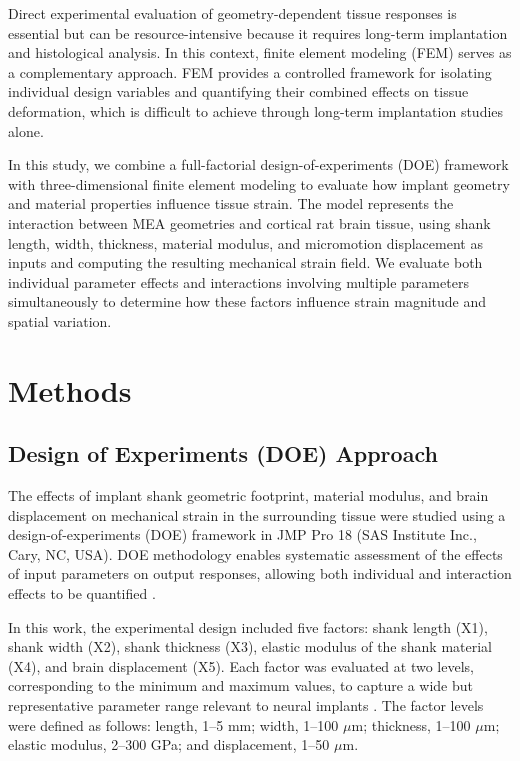 \documentclass[fleqn,10pt]{wlscirep}
\begin{document}
Direct experimental evaluation of geometry-dependent tissue responses is essential but can be resource-intensive because it requires long-term implantation and histological analysis. In this context, finite element modeling (FEM) serves as a complementary approach. FEM provides a controlled framework for isolating individual design variables and quantifying their combined effects on tissue deformation, which is difficult to achieve through long-term implantation studies alone.

In this study, we combine a full-factorial design-of-experiments (DOE) framework with three-dimensional finite element modeling to evaluate how implant geometry and material properties influence tissue strain. The model represents the interaction between MEA geometries and cortical rat brain tissue, using shank length, width, thickness, material modulus, and micromotion displacement as inputs and computing the resulting mechanical strain field. We evaluate both individual parameter effects and interactions involving multiple parameters simultaneously to determine how these factors influence strain magnitude and spatial variation.





%

\section{Methods}
\subsection{Design of Experiments (DOE) Approach}



The effects of implant shank geometric footprint, material modulus, and brain displacement on mechanical strain in the surrounding tissue were studied using a design-of-experiments (DOE) framework in JMP Pro 18 (SAS Institute Inc., Cary, NC, USA). DOE methodology enables systematic assessment of the effects of input parameters on output responses, allowing both individual and interaction effects to be quantified \cite{Kumar2014, Krishnan2021}.

In this work, the experimental design included five factors: shank length (X1), shank width (X2), shank thickness (X3), elastic modulus of the shank material (X4), and brain displacement (X5). Each factor was evaluated at two levels, corresponding to the minimum and maximum values, to capture a wide but representative parameter range relevant to neural implants \cite{Deku2018, Deku2018a, Kozai2012, Sohal2016, Altuna2013, Harris2011a, Harris2011b, Ware2014, Ward2009, Barrese2013, Wester2009, Sohal2014, Rousche2001}. The factor levels were defined as follows: length, 1--5 mm; width, 1--100 $\mu$m; thickness, 1--100 $\mu$m; elastic modulus, 2--300 GPa; and displacement, 1--50 $\mu$m.
\end{document}
